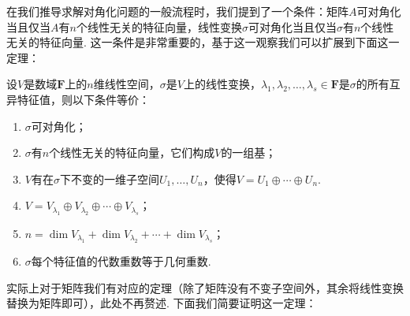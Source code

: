 在我们推导求解对角化问题的一般流程时，我们提到了一个条件：矩阵$A$可对角化当且仅当$A$有$n$个线性无关的特征向量，线性变换$\sigma$可对角化当且仅当$\sigma$有$n$个线性无关的特征向量. 这一条件是非常重要的，基于这一观察我们可以扩展到下面这一定理：
\begin{theorem}
    设$V$是数域$\mathbf{F}$上的$n$维线性空间，$\sigma$是$V$上的线性变换，$\lambda_1,\lambda_2,\ldots,\lambda_s\in\mathbf{F}$是$\sigma$的所有互异特征值，则以下条件等价：
    \begin{enumerate}
        \item \label{item:19:可对角化条件:1}
              $\sigma$可对角化；

        \item \label{item:19:可对角化条件:2}
              $\sigma$有$n$个线性无关的特征向量，它们构成$V$的一组基；

        \item \label{item:19:可对角化条件:3}
              $V$有在$\sigma$下不变的一维子空间$U_1,\ldots,U_n$，使得$V=U_1\oplus\cdots\oplus U_n$.

        \item \label{item:19:可对角化条件:4}
              $V=V_{\lambda_1}\oplus V_{\lambda_2}\oplus\cdots\oplus V_{\lambda_s}$；

        \item \label{item:19:可对角化条件:5}
              $n=\dim V_{\lambda_1}+\dim V_{\lambda_2}+\cdots+\dim V_{\lambda_s}$；

        \item \label{item:19:可对角化条件:6}
              $\sigma$每个特征值的代数重数等于几何重数.
    \end{enumerate}
\end{theorem}
实际上对于矩阵我们有对应的定理（除了矩阵没有不变子空间外，其余将线性变换替换为矩阵即可），此处不再赘述. 下面我们简要证明这一定理：

